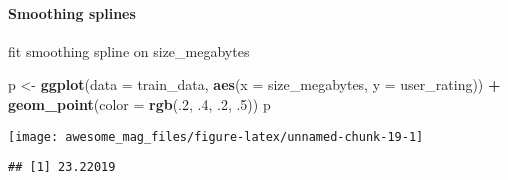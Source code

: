 \documentclass[]{article}
\newenvironment{Shaded}{\begin{snugshade}}{\end{snugshade}}
\newcommand{\KeywordTok}[1]{\textcolor[rgb]{0.13,0.29,0.53}{\textbf{#1}}}
\newcommand{\DataTypeTok}[1]{\textcolor[rgb]{0.13,0.29,0.53}{#1}}
\newcommand{\DecValTok}[1]{\textcolor[rgb]{0.00,0.00,0.81}{#1}}
\newcommand{\StringTok}[1]{\textcolor[rgb]{0.31,0.60,0.02}{#1}}
\newcommand{\CommentTok}[1]{\textcolor[rgb]{0.56,0.35,0.01}{\textit{#1}}}
\newcommand{\OperatorTok}[1]{\textcolor[rgb]{0.81,0.36,0.00}{\textbf{#1}}}
\newcommand{\NormalTok}[1]{#1}
\let\oldparagraph\paragraph
\renewcommand{\paragraph}[1]{\oldparagraph{#1}\mbox{}}
\begin{document}
\paragraph{Smoothing splines}\label{smoothing-splines}

fit smoothing spline on size\_megabytes

\begin{Shaded}
\begin{Highlighting}[]
\NormalTok{p <-}\StringTok{ }\KeywordTok{ggplot}\NormalTok{(}\DataTypeTok{data =}\NormalTok{ train_data, }\KeywordTok{aes}\NormalTok{(}\DataTypeTok{x =}\NormalTok{ size_megabytes, }\DataTypeTok{y =}\NormalTok{ user_rating)) }\OperatorTok{+}
\StringTok{     }\KeywordTok{geom_point}\NormalTok{(}\DataTypeTok{color =} \KeywordTok{rgb}\NormalTok{(.}\DecValTok{2}\NormalTok{, .}\DecValTok{4}\NormalTok{, .}\DecValTok{2}\NormalTok{, .}\DecValTok{5}\NormalTok{))}
\NormalTok{p}
\end{Highlighting}
\end{Shaded}

\texttt{[image: awesome\_mag\_files/figure-latex/unnamed-chunk-19-1]}

\begin{Shaded}
\end{Shaded}

\begin{verbatim}
## [1] 23.22019
\end{verbatim}
\end{document}

